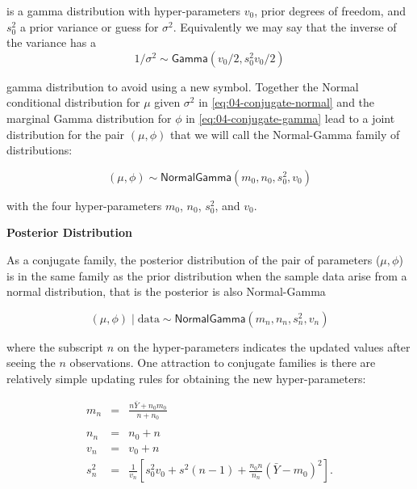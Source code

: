 \documentclass[]{book}
\theoremstyle{definition}
\theoremstyle{definition}
\theoremstyle{remark}
\begin{document}
is a gamma distribution with hyper-parameters \(v_0\), prior degrees of
freedom, and \(s^2_0\) a prior variance or guess for \(\sigma^2\).
Equivalently we may say that the inverse of the variance has a
\[1/\sigma^2 \sim \textsf{Gamma}(v_0/2, s^2_0 v_0/2)\]

gamma distribution to avoid using a new symbol. Together the Normal
conditional distribution for \(\mu\) given \(\sigma^2\) in
\eqref{eq:04-conjugate-normal} and the marginal Gamma distribution for
\(\phi\) in \eqref{eq:04-conjugate-gamma} lead to a joint distribution for
the pair \((\mu, \phi)\) that we will call the Normal-Gamma family of
distributions:

\begin{equation}(\mu, \phi) \sim \textsf{NormalGamma}(m_0, n_0, s^2_0, v_0)
\label{eq:04-conjugate-normal-gamma}
\end{equation}

with the four hyper-parameters \(m_0\), \(n_0\), \(s^2_0\), and \(v_0\).

\textbf{Posterior Distribution}

As a conjugate family, the posterior distribution of the pair of
parameters (\(\mu, \phi\)) is in the same family as the prior
distribution when the sample data arise from a normal distribution, that
is the posterior is also Normal-Gamma

\begin{equation}
(\mu, \phi) \mid \text{data} \sim \textsf{NormalGamma}(m_n, n_n, s^2_n, v_n)
\end{equation}

where the subscript \(n\) on the hyper-parameters indicates the updated
values after seeing the \(n\) observations. One attraction to conjugate
families is there are relatively simple updating rules for obtaining the
new hyper-parameters:

\begin{eqnarray*}
m_n & = & \frac{n \bar{Y} + n_0 m_0} {n + n_0}  \\
& \\
n_n & = & n_0 + n  \\
v_n & = & v_0 + n  \\
s^2_n & =  & \frac{1}{v_n}\left[s^2_0 v_0 + s^2 (n-1) + \frac{n_0 n}{n_n} (\bar{Y} - m_0)^2 \right]. 
\end{eqnarray*}
\end{document}
